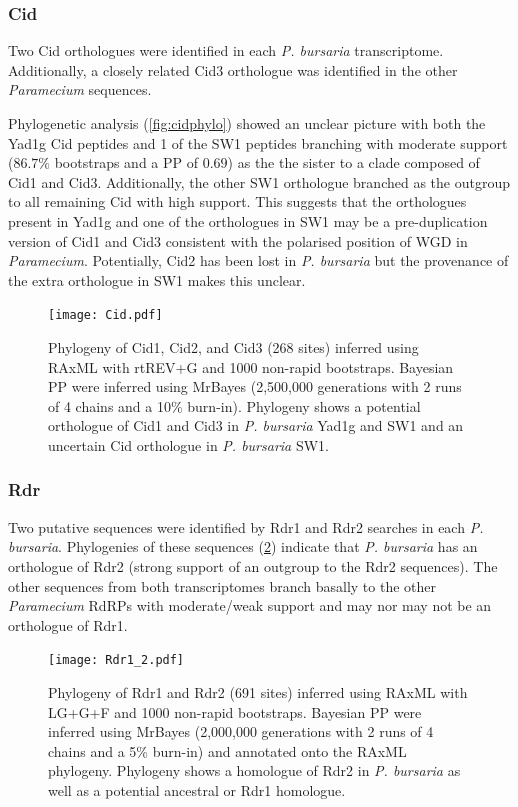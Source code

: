 \subsubsection{Cid}

Two Cid orthologues were identified in each \textit{P. bursaria}
transcriptome.  Additionally, a closely related Cid3 orthologue
was identified in the other \textit{Paramecium} sequences.

Phylogenetic analysis (\cref{fig:cidphylo}) showed an unclear
picture with both the Yad1g Cid peptides and 1 of the SW1 peptides
branching with moderate support (\(86.7\%\) bootstraps and
a PP of \(0.69\)) as the the sister to a 
clade composed of Cid1 and Cid3.  Additionally, the other
SW1 orthologue branched as the outgroup to all remaining Cid
with high support. 
This suggests that the orthologues present in Yad1g and one of
the orthologues in SW1 may be a pre-duplication version of Cid1
and Cid3 consistent with the polarised
 position of WGD in \textit{Paramecium}.  
 Potentially, Cid2 has been lost in \textit{P. bursaria}
but the provenance of the extra orthologue in SW1 makes this
unclear.

\begin{figure}
    \texttt{[image: Cid.pdf]}
    \caption[Cid Phylogeny]{
        Phylogeny of Cid1, Cid2, and Cid3 (268 sites) inferred
        using RAxML with rtREV+G and 1000 non-rapid bootstraps.
        Bayesian PP were inferred using MrBayes (2,500,000 generations 
        with 2 runs of 4 chains and a 10\% burn-in).  Phylogeny
        shows a potential orthologue of Cid1 and Cid3 in \textit{P. bursaria}
        Yad1g and SW1 and an uncertain Cid orthologue in \textit{P. bursaria}
        SW1.}
    \label{fig:cidphlyo}
\end{figure}

\subsubsection{Rdr}

Two putative sequences were identified by Rdr1 and Rdr2 searches in each
\textit{P. bursaria}.  Phylogenies of these sequences (\cref{fig:rdr12_phylo})
indicate that \textit{P. bursaria} has an orthologue of
Rdr2 (strong support of an outgroup to the Rdr2 sequences).
The other sequences from both transcriptomes branch basally
to the other \textit{Paramecium} RdRPs with moderate/weak support
and may nor may not be an orthologue of Rdr1.


\begin{figure}
    \texttt{[image: Rdr1\_2.pdf]}
    \caption[Rdr1 and Rdr2 Phylogeny]{Phylogeny of Rdr1 and Rdr2
        (691 sites) inferred using RAxML with LG+G+F and 1000
        non-rapid bootstraps.  Bayesian PP were inferred using MrBayes
        (2,000,000 generations with 2 runs of 4 chains and a 5\% burn-in)
        and annotated onto the RAxML phylogeny. Phylogeny
        shows a homologue of Rdr2 in \textit{P. bursaria} as well
    as a potential ancestral or Rdr1 homologue.}
    \label{fig:rdr12_phylo}
\end{figure}

